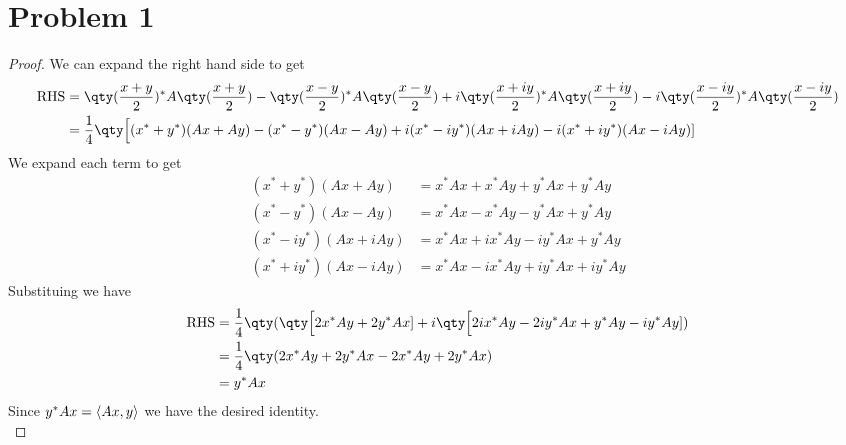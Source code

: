 \documentclass{article}
\begin{document}
\section*{Problem 1}
\begin{proof}
    We can expand the right hand side to get
    \begin{align*}
        \text{RHS} &= \qty(\frac{x+y}{2})^* A \qty(\frac{x+y}{2}) - \qty(\frac{x-y}{2})^* A \qty(\frac{x-y}{2}) + i \qty(\frac{x+iy}{2})^* A \qty(\frac{x+iy}{2}) - i\qty(\frac{x-iy}{2})^* A \qty(\frac{x-iy}{2}) \\
            &= \frac{1}{4} \qty\Big[
                (x^*+y^*)(Ax+Ay) - (x^* - y^*)(Ax - Ay) + i(x^* - iy^*)(Ax + iAy) - i(x^*+iy^*)(Ax - iAy)
            ]
    \end{align*}
    We expand each term to get
    \begin{align*}
        (x^*+y^*)(Ax+Ay) &= x^* Ax + x^* Ay + y^* Ax + y^* A y \\[10pt]
        (x^* - y^*)(Ax - Ay) &= x^* Ax - x^* Ay - y^* Ax + y^* Ay \\[10pt]
        (x^* - iy^*)(Ax + iAy) &= x^* Ax + ix^* Ay - iy^* Ax + y^* Ay \\[10pt]
        (x^*+iy^*)(Ax - iAy) &= x^* Ax - ix^* Ay + iy^* Ax + iy^* Ay
    \end{align*}
    Substituing we have
    \begin{align*}
        \text{RHS} &= \frac{1}{4}\qty(\qty\Big[2x^* Ay + 2y^* Ax] + i\qty\Big[2i x^* Ay - 2i y^* Ax + y^* Ay - iy^* Ay] )\\
                &= \frac{1}{4} \qty(2x^* Ay + 2y^* Ax - 2x^* Ay + 2y^* Ax) \\
                &= y^* Ax
    \end{align*}
    Since $y^* Ax = \iprd{Ax, y}$ we have the desired identity.
    \\


\end{proof}
\end{document}
